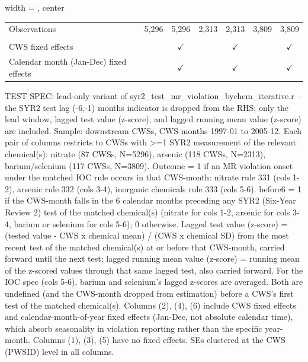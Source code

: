 \begin{table}[htbp]
\begin{adjustbox}{width = \textwidth, center}
\begin{tabular}{lcccccc}
          \\
         
         Observations                           & 5,296         & 5,296         & 2,313                  & 2,313         & 3,809          & 3,809\\  
         
          \\
         
         CWS fixed effects                      &               & $\checkmark$  &                        & $\checkmark$  &                & $\checkmark$\\   
         Calendar month (Jan-Dec) fixed effects &               & $\checkmark$  &                        & $\checkmark$  &                & $\checkmark$\\   
         
         \bottomrule
         
      \end{tabular}
      
      
      
   \end{adjustbox}
      {\tiny\linespread{1}\selectfont \par \raggedright 
   TEST SPEC: lead-only variant of syr2\_test\_mr\_violation\_bychem\_iterative.r -- the SYR2 test lag (-6,-1) months indicator is dropped from the RHS; only the lead window, lagged test value (z-score), and lagged running mean value (z-score) are included. Sample: downstream CWSs, CWS-months 1997-01 to 2005-12. Each pair of columns restricts to CWSs with >=1 SYR2 measurement of the relevant chemical(s): nitrate (87 CWSs, N=5296), arsenic (118 CWSs, N=2313), barium/selenium (117 CWSs, N=3809). Outcome = 1 if an MR violation onset under the matched IOC rule occurs in that CWS-month: nitrate rule 331 (cols 1-2), arsenic rule 332 (cols 3-4), inorganic chemicals rule 333 (cols 5-6). before6 = 1 if the CWS-month falls in the 6 calendar months preceding any SYR2 (Six-Year Review 2) test of the matched chemical(s) (nitrate for cols 1-2, arsenic for cols 3-4, barium or selenium for cols 5-6); 0 otherwise. Lagged test value (z-score) = (tested value - CWS x chemical mean) / (CWS x chemical SD) from the most recent test of the matched chemical(s) at or before that CWS-month, carried forward until the next test; lagged running mean value (z-score) = running mean of the z-scored values through that same lagged test, also carried forward. For the IOC spec (cols 5-6), barium and selenium's lagged z-scores are averaged. Both are undefined (and the CWS-month dropped from estimation) before a CWS's first test of the matched chemical(s). Columns (2), (4), (6) include CWS fixed effects and calendar-month-of-year fixed effects (Jan-Dec, not absolute calendar time), which absorb seasonality in violation reporting rather than the specific year-month. Columns (1), (3), (5) have no fixed effects. SEs clustered at the CWS (PWSID) level in all columns.}
   
\end{table}


